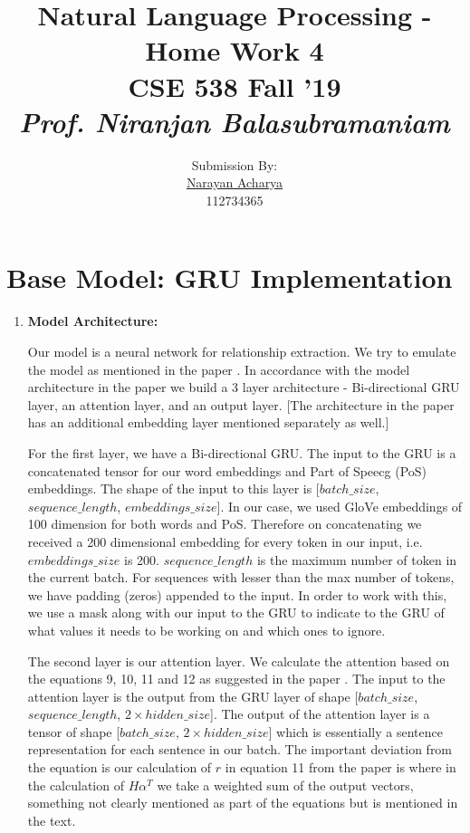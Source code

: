 \documentclass[11pt]{article}
\title{
	Natural Language Processing - Home Work 4\\[2mm]
	\large CSE 538 Fall '19\\[1mm]
	\textit{Prof. Niranjan Balasubramaniam}
}
\author{
	\small Submission By: \\
	\href{mailto:nacharya@cs.stonybrook.edu}{Narayan Acharya} \\
	\small 112734365
}
\date{\vspace{-5ex}}
\begin{document}
	
\maketitle
\thispagestyle{fancy} %

\tableofcontents

\section{Base Model: GRU Implementation}
\begin{enumerate}

\item \textbf{Model Architecture:} 

Our model is a neural network for relationship extraction. We try to emulate the model as mentioned in the paper \cite{GRUBaseModel}. In accordance with the model architecture in the paper we build a 3 layer architecture - Bi-directional GRU layer, an attention layer, and an output layer. [The architecture in the paper has an additional embedding layer mentioned separately as well.]

For the first layer, we have a Bi-directional GRU. The input to the GRU is a concatenated tensor for our word embeddings and Part of Speecg (PoS) embeddings. The shape of the input to this layer is [$batch\_size$, $sequence\_length$, $embeddings\_size$]. In our case, we used GloVe embeddings of 100 dimension for both words and PoS. Therefore on concatenating we received a 200 dimensional embedding for every token in our input, i.e. $embeddings\_size$ is 200. $sequence\_length$ is the maximum number of token in the current batch. For sequences with lesser than the max number of tokens, we have padding (zeros) appended to the input. In order to work with this, we use a mask along with our input to the GRU to indicate to the GRU of what values it needs to be working on and which ones to ignore.

The second layer is our attention layer. We calculate the attention based on the equations 9, 10, 11 and 12 as suggested in the paper \cite{GRUBaseModel}. The input to the attention layer is the output from the GRU layer of shape [$batch\_size$, $sequence\_length$, $2 \times hidden\_size $]. The output of the attention layer is a tensor of shape [$batch\_size$, $2 \times hidden\_size$] which is essentially a sentence representation for each sentence in our batch. The important deviation from the equation is our calculation of $ r $ in equation 11 from the paper is where in the calculation of $H\alpha^T$ we take a weighted sum of the output vectors, something not clearly mentioned as part of the equations but is mentioned in the text.


\end{enumerate}
\end{document}
